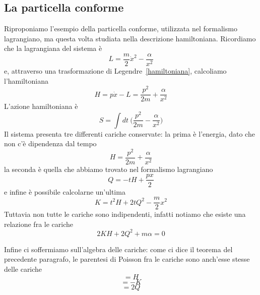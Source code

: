 \subsection{La particella conforme}
    Riproponiamo l'esempio della particella conforme, utilizzata nel formalismo lagrangiano, ma questa volta studiata nella descrizione hamiltoniana. Ricordiamo che la lagrangiana del sistema è 
\begin{equation*}
    L = \frac{m}{2} \dot x^2 - \frac{\alpha}{x^2}
\end{equation*}
    e, attraverso una trasformazione di Legendre~\eqref{hamiltoniana}, calcoliamo l'hamiltoniana
\begin{equation*}
    H = p \dot x - L = \frac{p^2}{2m} + \frac{\alpha}{x^2}
\end{equation*}
    L'azione hamiltoniana è
\begin{equation*}
    S = \int dt~ \Big (\frac{p^2}{2m} - \frac{\alpha}{x^2} \Big)
\end{equation*}
    Il sistema presenta tre differenti cariche conservate: la prima è l'energia, dato che non c'è dipendenza dal tempo
\begin{equation*}
    H = \frac{p^2}{2m} + \frac{\alpha}{x^2}
\end{equation*}
    la seconda è quella che abbiamo trovato nel formalismo lagrangiano
\begin{equation*}
    Q = -tH + \frac{px}{2}
\end{equation*}
    e infine è possibile calcolarne un'ultima
\begin{equation*}
    K = t^2H + 2 t Q^2 - \frac{m}{2} x^2
\end{equation*}  
    Tuttavia non tutte le cariche sono indipendenti, infatti notiamo che esiste una relazione fra le cariche 
\begin{equation*}
    2KH + 2Q^2 + m\alpha = 0
\end{equation*}

    Infine ci soffermiamo sull'algebra delle cariche: come ci dice il teorema del precedente paragrafo, le parentesi di Poisson fra le cariche sono anch'esse stesse delle cariche
\begin{equation*}
    [Q, ~H] = H
\end{equation*}
\begin{equation*}
    [Q, ~K] = -K
\end{equation*}
\begin{equation*}
    [K, ~H] = 2Q
\end{equation*}

